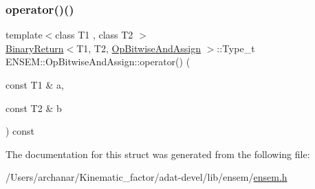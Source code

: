 \subsubsection{\texorpdfstring{operator()()}{operator()()}\hspace{0.1cm}{\footnotesize\ttfamily [3/3]}}
{\footnotesize\ttfamily template$<$class T1 , class T2 $>$ \\
\mbox{\hyperlink{structENSEM_1_1BinaryReturn}{Binary\+Return}}$<$T1, T2, \mbox{\hyperlink{structENSEM_1_1OpBitwiseAndAssign}{Op\+Bitwise\+And\+Assign}} $>$\+::Type\+\_\+t E\+N\+S\+E\+M\+::\+Op\+Bitwise\+And\+Assign\+::operator() (\begin{DoxyParamCaption}\item[{const T1 \&}]{a,  }\item[{const T2 \&}]{b }\end{DoxyParamCaption}) const\hspace{0.3cm}{\ttfamily [inline]}}



The documentation for this struct was generated from the following file\+:\begin{DoxyCompactItemize}
\item 
/\+Users/archanar/\+Kinematic\+\_\+factor/adat-\/devel/lib/ensem/\mbox{\hyperlink{adat-devel_2lib_2ensem_2ensem_8h}{ensem.\+h}}\end{DoxyCompactItemize}
